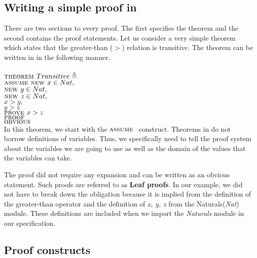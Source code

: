 \documentclass[fleqn]{tukseminar}
\begin{document}
			\subsection{Writing a simple proof in \tla}
			There are two sections to every proof. The first specifies the theorem and the second contains the proof statements. Let us consider a very simple theorem which states that the greater-than ($>$) relation is transitive. The theorem can be written in \tla in the following manner.\\ \\
			$\textsc{theorem } Transitive \triangleq$\\
			\hspace*{0.5cm}$ \textsc{assume } \textsc{new } x \in Nat,$\\
			\hspace*{2cm}$ \textsc{new } y \in Nat,$\\
			\hspace*{2cm}$ \textsc{new } z \in Nat,$\\
			\hspace*{2cm}$ x > y , $\\
			\hspace*{2cm}$y > z $\\
			\hspace*{2cm}$\textsc{prove } x > z$ \\
			$\textsc{proof }$\\ 
			\hspace*{.8cm}$\textsc{obvious }$\\
			
			In this theorem, we start with the $\textsc{assume }$ construct. Theorems in \tla do not borrow definitions of variables. Thus, we specifically need to tell the proof system about the variables we are going to use as well as the domain of the values that the variables can take.
			
			The proof did not require any expansion and can be written as an obvious statement. Such proofs are referred to as \textbf{Leaf proofs}. In our example, we did not have to break down the obligation because it is implied from the definition of the greater-than operator and the definition of \textit{x, y, z} from the Naturals(\textit{Nat}) module. These definitions are included when we import the \textit{Naturals} module in our specification.
			
			\subsection{\tla Proof constructs}
			
\end{document}
